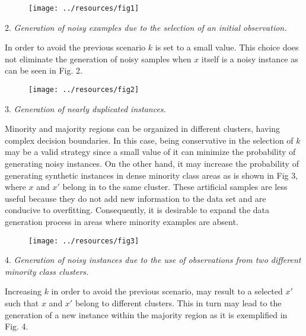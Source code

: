 \documentclass[parskip=full]{scrartcl}
\begin{document}
\begin{figure}[H]
	\centering
	\texttt{[image: ../resources/fig1]}
\end{figure}

2. \textit{Generation of noisy examples due to the selection of an initial observation.}

In order to avoid the previous scenario \( k \) is set to a small value. This choice does not eliminate the generation of noisy samples when \( x \) itself is a noisy instance as can be seen in Fig. 2.

\begin{figure}[H]
	\centering
	\texttt{[image: ../resources/fig2]}
\end{figure}

3. \textit{Generation of nearly duplicated instances.}

Minority and majority regions can be organized in different clusters, having complex decision boundaries.  In this case, being conservative in the selection of \( k \) may be a valid strategy since a small value of it can minimize the probability of generating noisy instances. On the other hand, it may increase the probability of generating synthetic instances in dense minority class areas as is shown in Fig 3, where \(x\) and \(x'\) belong in to the same cluster. These artificial samples are less useful because they do not add new information to the data set and are conducive to overfitting. Consequently, it is desirable to expand the data generation process in areas where minority examples are absent.

\begin{figure}[H]
	\centering
	\texttt{[image: ../resources/fig3]}
	\end{figure}

4. \textit{Generation of noisy instances due to the use of observations from two different minority class clusters.}

Increasing \( k \)  in order to avoid the previous scenario,  may result to a selected \( x' \) such that \( x \) and \( x' \) belong to different clusters. This in turn may lead to the generation of a new instance within the majority region as it is exemplified in Fig. 4. 
\end{document}
